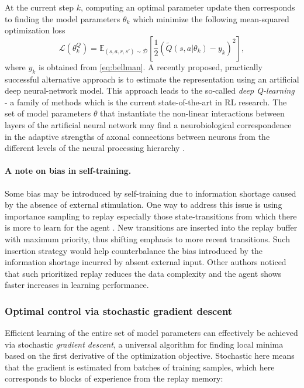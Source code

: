 \documentclass[10pt,letterpaper]{article}
\begin{document}
At the current step $k$, computing an optimal parameter update then corresponds to
finding the model parameters $\theta_{k}$ which minimize the following mean-squared
optimization loss
\begin{equation}
  \mathcal L(\theta^Q_{k})
  = \mathbb E_{(s, a, r, s') \sim \mathcal D}\left[\frac{1}{2}(\tilde{Q}(s, a|\theta_{k}) - y_k)^2\right],
  \label{eq:oracle}
\end{equation}
where $y_k$ is obtained from \eqref{eq:bellman}.
A recently proposed, practically successful alternative approach is to estimate the
representation using an artificial deep neural-network model. This approach leads to the
so-called \textit{deep Q-learning}~\citep{mnih2015,silver2016mastering} - a family of methods which
is the current state-of-the-art in RL research.
The set of model parameters $\theta$ that instantiate the non-linear interactions
between layers of the artificial neural network
may find a neurobiological correspondence in the adaptive strengths of axonal
connections between neurons from the different levels
of the neural processing hierarchy
\citep{mesulam1998sensation, taylor2015global}.

\paragraph*{A note on bias in self-training.}
Some bias may be introduced by self-training due to information shortage caused by the absence of external stimulation.
 One way to address this issue is using importance sampling to replay especially those state-transitions from which there is more to learn for the agent \citep{schaul2015, hessel2017}. New transitions are inserted into the replay buffer with maximum priority, thus shifting emphasis to more recent transitions. Such insertion strategy would help counterbalance the bias introduced by the information shortage incurred by absent external input. Other authors noticed \citep{hessel2017} that such prioritized replay reduces the data complexity and the agent shows faster increases in learning performance.


\subsubsection{Optimal control via stochastic gradient descent}
Efficient learning of the entire set of model parameters can effectively be achieved
via stochastic \textit{gradient descent}, a universal algorithm for finding
local minima based on the first derivative of the optimization objective.
Stochastic here means that the gradient is estimated from batches of training samples,
which here corresponds to blocks of experience from the replay memory:
\end{document}
